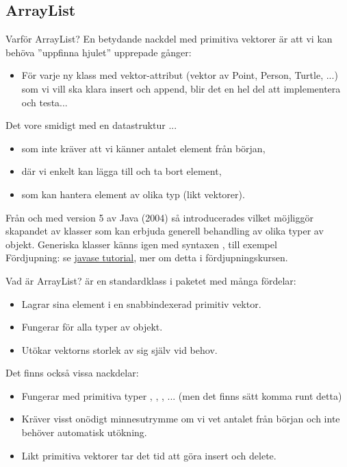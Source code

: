 \documentclass{lecturenotes}
\begin{document}
\subsection{ArrayList}
\begin{Slide}{Varför ArrayList?}\footnotesize
En betydande nackdel med primitiva vektorer är att vi kan behöva ''uppfinna hjulet'' upprepade gånger:
\begin{itemize}
\item För varje ny klass med vektor-attribut (vektor av Point, Person, Turtle, ...) som vi vill ska klara insert och append, blir det en hel del att implementera och testa... 
\end{itemize}
Det vore smidigt med en datastruktur ...
\begin{itemize}
\item som inte kräver att vi känner antalet element från början,
\item där vi enkelt kan lägga till och ta bort element,
\item som kan hantera element av olika typ (likt vektorer).
\end{itemize}
Från och med version 5 av Java (2004) så introducerades  vilket möjliggör skapandet av klasser som kan erbjuda generell behandling av olika typer av objekt. Generiska klasser känns igen med syntaxen , till exempel    \\ {\footnotesize Fördjupning: se   \href{https://docs.oracle.com/javase/tutorial/extra/generics/intro.html}{javase tutorial}, mer om detta i fördjupningskursen.}
\end{Slide}

\begin{Slide}{Vad är ArrayList?}
 är en standardklass i paketet  med många fördelar:
\begin{itemize}
\item Lagrar sina element i en snabbindexerad primitiv vektor.
\item Fungerar för alla typer av objekt.
\item Utökar vektorns storlek av sig själv vid behov.
\end{itemize}
Det finns också vissa nackdelar:
\begin{itemize}
\item Fungerar  med primitiva typer , , , ... (men det finns sätt komma runt detta)
\item Kräver visst onödigt minnesutrymme om vi vet antalet från  början och inte behöver automatisk utökning. 
\item Likt primitiva vektorer tar det tid att göra insert och delete.
\end{itemize}
\end{Slide}
\end{document}
